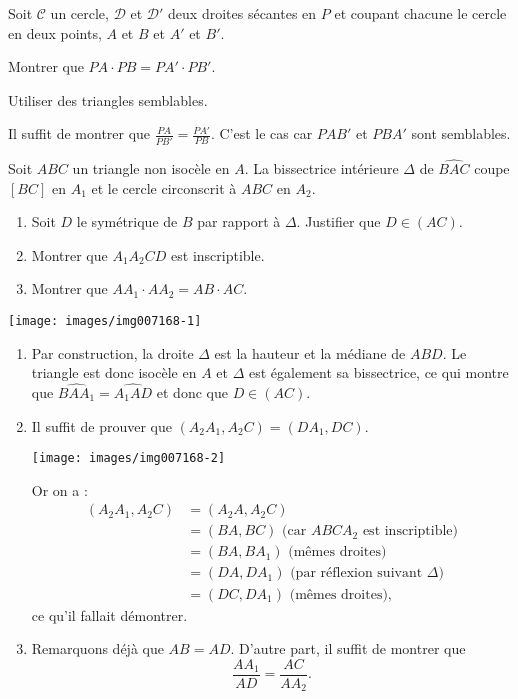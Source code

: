 \begin{exo}
Soit $\mathcal C$ un cercle, $\mathcal D$ et $\mathcal D'$ deux droites sécantes en $P$ et coupant chacune le cercle en deux points, $A$ et $B$ et $A'$ et $B'$.

Montrer que $PA\cdot PB = PA'\cdot PB'$.

\begin{hint}
Utiliser des triangles semblables.
\end{hint}
\begin{sol}
Il suffit de montrer que $\frac{PA}{PB'} = \frac{PA'}{PB}$. C'est le cas car $PAB'$ et $PBA'$ sont semblables.
\end{sol}
\end{exo}




\begin{exo}[Réflexion] %

Soit $ABC$ un triangle non isocèle en $A$. %
La bissectrice intérieure $\Delta$ de $\widehat{BAC}$ coupe $[BC]$ en $A_1$ et le cercle circonscrit à $ABC$ en $A_2$.
\begin{enumerate}
\item Soit $D$ le symétrique de $B$ par rapport à $\Delta$. Justifier que $D \in (AC)$.
\item Montrer que $A_1A_2CD$ est inscriptible.
\item Montrer que $AA_1\cdot AA_2 = AB\cdot AC$. %
\end{enumerate}
\begin{center}
\texttt{[image: images/img007168-1]}
\end{center}


\begin{sol}
\begin{enumerate}
\item Par construction, la droite $\Delta$ est la hauteur et la médiane de $ABD$. Le triangle est donc isocèle en $A$ et $\Delta$ est également sa bissectrice, ce qui montre que $\widehat{BAA_1} = \widehat{A_1AD}$ et donc que $D\in (AC)$.
\item Il suffit de prouver que $(A_2A_1,A_2C)=(DA_1,DC)$.
\begin{center}
\texttt{[image: images/img007168-2]}
\end{center}
Or on a :
\begin{align*}
(A_2A_1,A_2C)
&= (A_2A,A_2C)\\
&= (BA,BC) \text{ (car $ABCA_2$ est inscriptible)}\\
&= (BA,BA_1) \text{ (mêmes droites)}\\
&= (DA,DA_1) \text{ (par réflexion suivant $\Delta$)}\\
&= (DC,DA_1) \text{ (mêmes droites)},
\end{align*}
ce qu'il fallait démontrer.
\item Remarquons déjà que $AB=AD$.  D'autre part, il suffit de montrer que
\[ \frac{AA_1}{AD} = \frac{AC}{AA_2}.\]


\end{enumerate}
\end{sol}
\end{exo}
